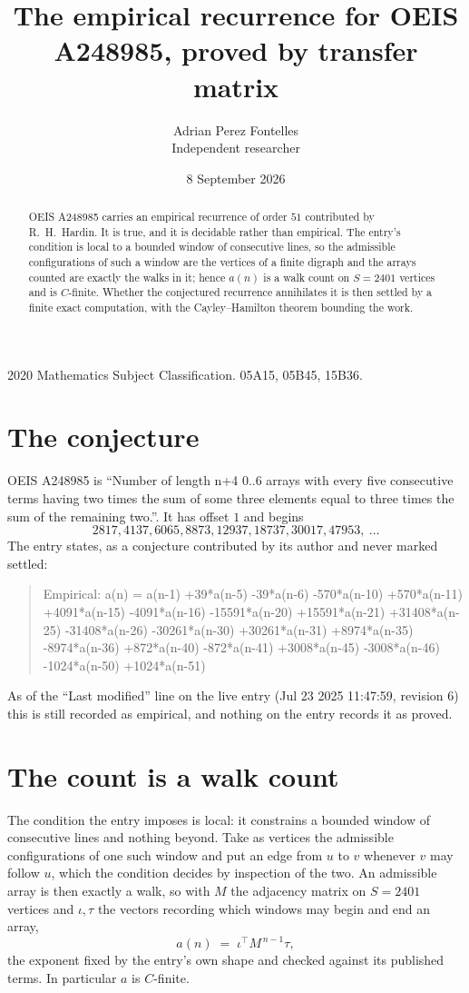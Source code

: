 \documentclass[11pt,a4paper]{article}
\title{The empirical recurrence for OEIS A248985, proved by transfer matrix}
\author{Adrian Perez Fontelles\\ \small Independent researcher}
\date{8 September 2026}
\theoremstyle{plain}
\theoremstyle{definition}
\begin{document}
\maketitle

\begin{abstract}
OEIS A248985 carries an empirical recurrence of order $51$ contributed by R.~H.~Hardin. It is
true, and it is decidable rather than empirical. The entry's condition is local to a bounded window of consecutive lines, so
the admissible configurations of such a window are the vertices of a finite digraph and the
arrays counted are exactly the walks in it; hence $a(n)$ is a walk count on $S=2401$ vertices
and is $C$-finite. Whether the conjectured recurrence annihilates it is then settled by a
finite exact computation, with the Cayley--Hamilton theorem bounding the work.
\end{abstract}

\noindent\small 2020 Mathematics Subject Classification. 05A15, 05B45, 15B36.\normalsize

\section{The conjecture}

OEIS A248985 is ``Number of length n+4 0..6 arrays with every five consecutive terms having two times the sum of some three elements equal to three times the sum of the remaining two.''. It has offset $1$ and begins
\[
2817, 4137, 6065, 8873, 12937, 18737, 30017, 47953,\ \dots
\]
The entry states, as a conjecture contributed by its author and never marked settled:
\begin{quote}
Empirical: a(n) = a(n-1) +39*a(n-5) -39*a(n-6) -570*a(n-10) +570*a(n-11) +4091*a(n-15) -4091*a(n-16) -15591*a(n-20) +15591*a(n-21) +31408*a(n-25) -31408*a(n-26) -30261*a(n-30) +30261*a(n-31) +8974*a(n-35) -8974*a(n-36) +872*a(n-40) -872*a(n-41) +3008*a(n-45) -3008*a(n-46) -1024*a(n-50) +1024*a(n-51)
\end{quote}
As of the ``Last modified'' line on the live entry (Jul 23 2025 11:47:59, revision 6) this is still
recorded as empirical, and nothing on the entry records it as proved.

\section{The count is a walk count}

The condition the entry imposes is local: it constrains a bounded window of consecutive lines and nothing beyond. Take as
vertices the admissible configurations of one such window and put an edge from $u$ to $v$
whenever $v$ may follow $u$, which the condition decides by inspection of the two. An
admissible array is then exactly a walk, so with $M$ the adjacency matrix on $S=2401$ vertices
and $\iota,\tau$ the vectors recording which windows may begin and end an array,
\[
a(n)\;=\;\iota^{\!\top}M^{\,n-1}\tau ,
\]
the exponent fixed by the entry's own shape and checked against its published terms. In
particular $a$ is $C$-finite.
\end{document}
